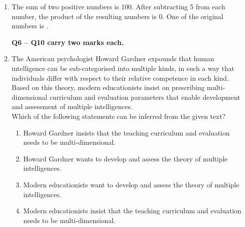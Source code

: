 \documentclass[journal]{IEEEtran}
\begin{document}
\begin{enumerate}
\begin{enumerate}

\end{enumerate}

\item The sum of two positive numbers is 100. After subtracting 5 from each number, the product of the resulting numbers is 0. One of the original numbers is \underline{\hspace{2cm}}. \hfill {}

\begin{enumerate}

\end{enumerate}

\noindent \textbf{Q6 -- Q10 carry two marks each.}

\item The American psychologist Howard Gardner expounds that human intelligence can be sub-categorised into multiple kinds, in such a way that individuals differ with respect to their relative competence in each kind. Based on this theory, modern educationists insist on prescribing multi-dimensional curriculum and evaluation parameters that enable development and assessment of multiple intelligences.\\[0.3cm]
Which of the following statements can be inferred from the given text? \hfill {}

\begin{enumerate}
\item Howard Gardner insists that the teaching curriculum and evaluation needs to be multi-dimensional.  
\item Howard Gardner wants to develop and assess the theory of multiple intelligences.  
\item Modern educationists want to develop and assess the theory of multiple intelligences.  
\item Modern educationists insist that the teaching curriculum and evaluation needs to be multi-dimensional.  
\end{enumerate}


\end{enumerate}
\end{document}
